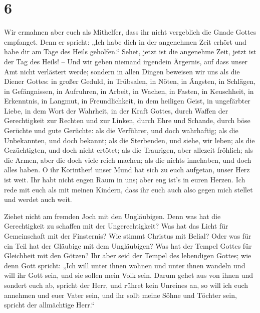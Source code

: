 \hypertarget{section-5}{%
\section{6}\label{section-5}}

 Wir ermahnen aber euch als Mithelfer, dass ihr nicht
vergeblich die Gnade Gottes empfanget.  Denn er spricht:
„Ich habe dich in der angenehmen Zeit erhört und habe dir am Tage des
Heils geholfen.`` Sehet, jetzt ist die angenehme Zeit, jetzt ist der Tag
des Heils! --  Und wir geben niemand irgendein Ärgernis,
auf dass unser Amt nicht verlästert werde;  sondern in
allen Dingen beweisen wir uns als die Diener Gottes: in großer Geduld,
in Trübsalen, in Nöten, in Ängsten,  in Schlägen, in
Gefängnissen, in Aufruhren, in Arbeit, in Wachen, in Fasten,
 in Keuschheit, in Erkenntnis, in Langmut, in
Freundlichkeit, in dem heiligen Geist, in ungefärbter Liebe,
 in dem Wort der Wahrheit, in der Kraft Gottes, durch
Waffen der Gerechtigkeit zur Rechten und zur Linken, 
durch Ehre und Schande, durch böse Gerüchte und gute Gerüchte: als die
Verführer, und doch wahrhaftig;  als die Unbekannten, und
doch bekannt; als die Sterbenden, und siehe, wir leben; als die
Gezüchtigten, und doch nicht ertötet;  als die Traurigen,
aber allezeit fröhlich; als die Armen, aber die doch viele reich machen;
als die nichts innehaben, und doch alles haben.  O ihr
Korinther! unser Mund hat sich zu euch aufgetan, unser Herz ist weit.
 Ihr habt nicht engen Raum in uns; aber eng ist's in
euren Herzen.  Ich rede mit euch als mit meinen Kindern,
dass ihr euch auch also gegen mich stellet und werdet auch weit.

 Ziehet nicht am fremden Joch mit den Ungläubigen. Denn
was hat die Gerechtigkeit zu schaffen mit der Ungerechtigkeit? Was hat
das Licht für Gemeinschaft mit der Finsternis?  Wie
stimmt Christus mit Belial? Oder was für ein Teil hat der Gläubige mit
dem Ungläubigen?  Was hat der Tempel Gottes für
Gleichheit mit den Götzen? Ihr aber seid der Tempel des lebendigen
Gottes; wie denn Gott spricht: „Ich will unter ihnen wohnen und unter
ihnen wandeln und will ihr Gott sein, und sie sollen mein Volk sein.
 Darum gehet aus von ihnen und sondert euch ab, spricht
der Herr, und rühret kein Unreines an, so will ich euch annehmen
 und euer Vater sein, und ihr sollt meine Söhne und
Töchter sein, spricht der allmächtige Herr.``

